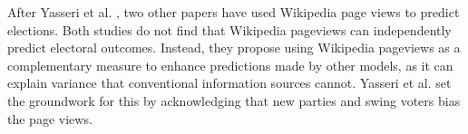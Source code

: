After Yasseri et al. , two other papers \cite{Salem2021Jun, Smith2017Sep} have used Wikipedia page views to predict elections. Both studies do not find that Wikipedia pageviews can independently predict electoral outcomes. Instead, they propose using Wikipedia pageviews as a complementary measure to enhance predictions made by other models, as it can explain variance that conventional information sources cannot. Yasseri et al.  set the groundwork for this by acknowledging that new parties and swing voters bias the page views.
  





